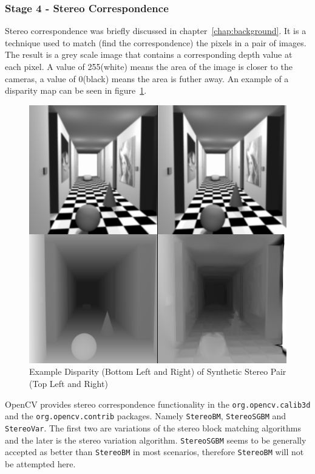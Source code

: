 \documentclass[11pt,oneside]{report}
\newcommand\code[1]{\texttt{#1}}
\begin{document}
		\subsubsection{Stage 4 - Stereo Correspondence}
		Stereo correspondence was briefly discussed in chapter~\ref{chap:background}.
		It is a technique used to match (find the correspondence) the pixels in a pair of images.
		The result is a grey scale image that contains a corresponding depth value at each pixel.
		A value of 255(white) means the area of the image is closer to the cameras, a value of 0(black) means the area is futher away.
		An example of a disparity map can be seen in figure~\ref{fig:dispExample}.
		\begin{figure}
			\centering
    				\includegraphics[width=\textwidth]{dispExample}
    				\caption{Example Disparity (Bottom Left and Right) of Synthetic Stereo Pair (Top Left and Right)  \protect\cite{image:stereoPair} {\label{fig:dispExample}}}
		\end{figure}	
		OpenCV provides stereo correspondence functionality in the \code{org.opencv.calib3d} and the \code{org.opencv.contrib} packages.
		Namely \code{StereoBM}, \code{StereoSGBM} and \code{StereoVar}.
		The first two are variations of the stereo block matching algorithms and the later is the stereo variation algorithm.
		\code{StereoSGBM} seems to be generally accepted as better than \code{StereoBM} in most scenarios, therefore \code{StereoBM} will not be attempted here.
		
\end{document}
